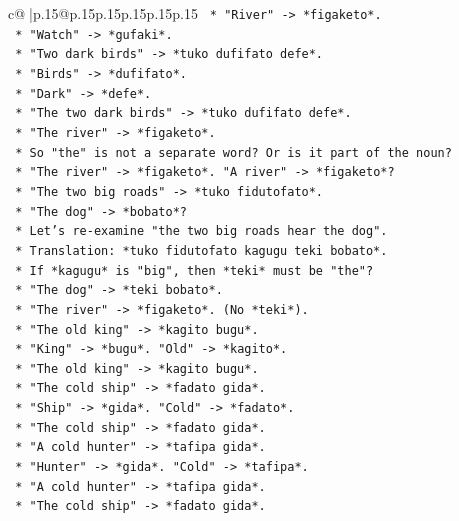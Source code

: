 \documentclass{article}
\begin{document}
{\begin{supertabular}{c@{$\;$}|p{.15\linewidth}@{}p{.15\linewidth}p{.15\linewidth}p{.15\linewidth}p{.15\linewidth}p{.15\linewidth}}
{{{\texttt{        *   "River" {-}> *figaketo*.} \\
\texttt{        *   "Watch" {-}> *gufaki*.} \\
\texttt{        *   "Two dark birds" {-}> *tuko dufifato defe*.} \\
\texttt{        *   "Birds" {-}> *dufifato*.} \\
\texttt{        *   "Dark" {-}> *defe*.} \\
\texttt{        *   "The two dark birds" {-}> *tuko dufifato defe*.} \\
\texttt{        *   "The river" {-}> *figaketo*.} \\
\texttt{        *   So "the" is not a separate word? Or is it part of the noun?} \\
\texttt{        *   "The river" {-}> *figaketo*. "A river" {-}> *figaketo*?} \\
\texttt{        *   "The two big roads" {-}> *tuko fidutofato*.} \\
\texttt{        *   "The dog" {-}> *bobato*?} \\
\texttt{        *   Let's re{-}examine "the two big roads hear the dog".} \\
\texttt{        *   Translation: *tuko fidutofato kagugu teki bobato*.} \\
\texttt{        *   If *kagugu* is "big", then *teki* must be "the"?} \\
\texttt{        *   "The dog" {-}> *teki bobato*.} \\
\texttt{        *   "The river" {-}> *figaketo*. (No *teki*).} \\
\texttt{        *   "The old king" {-}> *kagito bugu*.} \\
\texttt{        *   "King" {-}> *bugu*. "Old" {-}> *kagito*.} \\
\texttt{        *   "The old king" {-}> *kagito bugu*.} \\
\texttt{        *   "The cold ship" {-}> *fadato gida*.} \\
\texttt{        *   "Ship" {-}> *gida*. "Cold" {-}> *fadato*.} \\
\texttt{        *   "The cold ship" {-}> *fadato gida*.} \\
\texttt{        *   "A cold hunter" {-}> *tafipa gida*.} \\
\texttt{        *   "Hunter" {-}> *gida*. "Cold" {-}> *tafipa*.} \\
\texttt{        *   "A cold hunter" {-}> *tafipa gida*.} \\
\texttt{        *   "The cold ship" {-}> *fadato gida*.} \\
}}}
\end{supertabular}}
\end{document}
